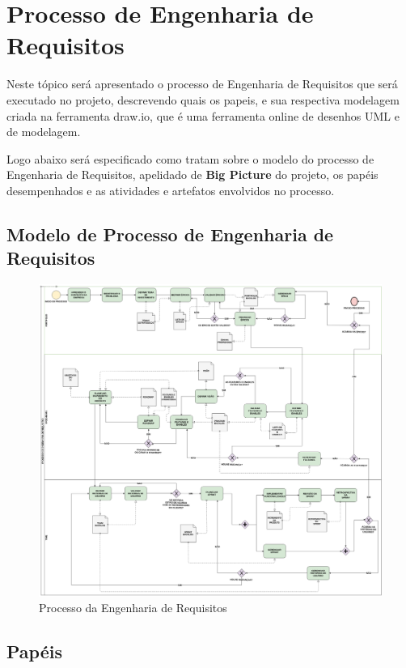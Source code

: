 \chapter{Processo de Engenharia de Requisitos}

  Neste tópico será apresentado o processo de Engenharia de Requisitos que será executado no projeto, descrevendo quais os papeis,
  e sua respectiva modelagem criada na ferramenta draw.io, que é uma ferramenta online de desenhos UML e de modelagem.

  Logo abaixo será especificado como tratam sobre o modelo do processo de Engenharia de Requisitos, apelidado de \textbf{Big Picture}
  do projeto, os papéis desempenhados e as atividades e artefatos envolvidos no processo.

\section{Modelo de Processo de Engenharia de Requisitos}

  \begin{figure}[!htb]
    \centering
    \includegraphics[width=15cm, keepaspectratio=true]{figuras/processo/processo.eps}
    \caption{Processo da Engenharia de Requisitos}
  \end{figure}

\section{Papéis}

